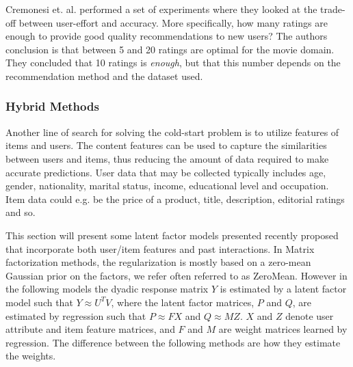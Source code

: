 
Cremonesi et. al. \cite{Cremonesi2012} performed a set of experiments where
they looked at the trade-off between user-effort and accuracy. More
specifically, how many ratings are enough to provide good quality
recommendations to new users? The authors conclusion is that between 5 and 20
ratings are optimal for the movie domain. They concluded that 10
ratings is \emph{enough}, but that this number depends on the recommendation method
and the dataset used.

\subsubsection{Hybrid Methods}


Another line of search for solving the cold-start problem is to utilize features of items and users. The content features can be used to capture the similarities between users and items, thus reducing the amount of data required to make accurate predictions. User data that may be collected typically includes age, gender, nationality, marital status, income, educational level and occupation. Item data could e.g. be the price of a product, title, description, editorial ratings and so.


This section will present some latent factor models presented recently proposed that incorporate both user/item features and past interactions. In Matrix factorization methods, the regularization is mostly based on a
zero-mean Gaussian prior on the factors, we refer often referred to as ZeroMean. However in the following models the dyadic response matrix $Y$ is estimated by a latent factor model such that $Y \approx U^{T}V$, where the latent factor matrices, $P$ and $Q$, are estimated by regression such that $P \approx FX$ and $Q \approx MZ$. $X$ and $Z$ denote user attribute and item feature matrices, and $F$ and $M$ are weight matrices learned by regression. The difference between the following methods are how they estimate the weights.

